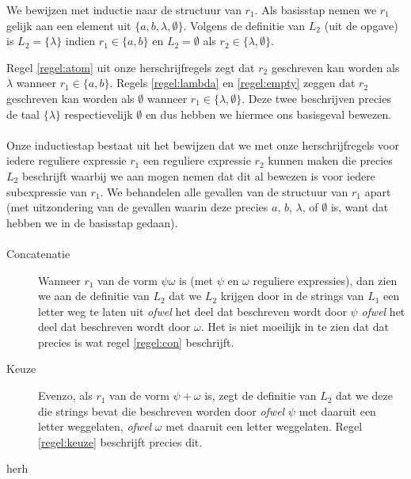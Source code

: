 \documentclass[a4paper,11pt]{article}
\begin{document}
We bewijzen met inductie naar de structuur van $r_{1}$. Als basisstap
nemen we $r_{1}$ gelijk aan een element uit $\{a,b,\lambda,\emptyset\}$.
Volgens de definitie van $L_{2}$ (uit de opgave) is $L_{2} = \{\lambda\}$
indien $r_{1} \in \{a,b\}$ en $L_{2} = \emptyset$ als $r_{2} \in
\{\lambda,\emptyset\}$.

Regel \ref{regel:atom} uit onze herschrijfregels zegt dat $r_{2}$ geschreven
kan worden als $\lambda$ wanneer $r_{1} \in \{a,b\}$. Regels
\ref{regel:lambda} en \ref{regel:empty} zeggen dat $r_{2}$ geschreven kan
worden als $\emptyset$ wanneer $r_{1} \in \{\lambda,\emptyset\}$. Deze twee
beschrijven precies de taal $\{\lambda\}$ respectievelijk $\emptyset$ en
dus hebben we hiermee ons basisgeval bewezen.

\paragraph{}

Onze inductiestap bestaat uit het bewijzen dat we met onze herschrijfregels
voor iedere reguliere expressie $r_{1}$ een reguliere expressie $r_{2}$
kunnen maken die precies $L_{2}$ beschrijft waarbij we aan mogen nemen dat
dit al bewezen is voor iedere subexpressie van $r_{1}$. We behandelen alle
gevallen van de structuur van $r_{1}$ apart (met uitzondering van de gevallen
waarin deze precies $a$, $b$, $\lambda$, of $\emptyset$ is, want dat hebben
we in de basisstap gedaan).

\paragraph{}

\begin{description}

\item[Concatenatie]

Wanneer $r_{1}$ van de vorm $\psi \omega$ is (met $\psi$ en $\omega$ reguliere
expressies), dan zien we aan de definitie van $L_{2}$ dat we $L_{2}$ krijgen
door in de strings van $L_{1}$ een letter weg te laten uit \emph{ofwel} het
deel dat beschreven wordt door $\psi$ \emph{ofwel} het deel dat beschreven
wordt door $\omega$. Het is niet moeilijk in te zien dat dat precies is wat
regel \ref{regel:con} beschrijft.

\item[Keuze]

Evenzo, als $r_{1}$ van de vorm $\psi + \omega$ is, zegt de definitie van
$L_{2}$ dat we deze die strings bevat die beschreven worden door \emph{ofwel}
$\psi$ met daaruit een letter weggelaten, \emph{ofwel} $\omega$ met daaruit
een letter weggelaten. Regel \ref{regel:keuze} beschrijft precies dit.

\item[herh]




\end{description}
\end{document}
